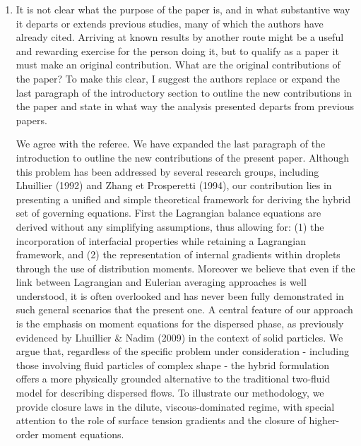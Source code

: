 \documentclass[10pt,a4paper]{article}
\newcommand{\tb}[1]{\color{blue}#1\color{black}}
\begin{document}
\begin{enumerate}
    \item It is not clear what the purpose of the paper is, and in what substantive way it departs or
    extends previous studies, many of which the authors have already cited. Arriving at known
    results by another route might be a useful and rewarding exercise for the person doing it, but
    to qualify as a paper it must make an original contribution. What are the original
    contributions of the paper? To make this clear, I suggest the authors replace or expand the
    last paragraph of the introductory section to outline the new contributions in the paper and
    state in what way the analysis presented departs from previous papers.
    
    \tb{
        We agree with the referee. 
        We have expanded the last paragraph of the introduction to outline the new contributions of the present paper.
        Although this problem has been addressed by several research groups, including Lhuillier (1992) and Zhang et Prosperetti (1994), our contribution lies in presenting a unified and simple theoretical framework for deriving the hybrid set of governing equations.
        First the Lagrangian balance equations are derived without any simplifying assumptions, thus allowing for: (1) the incorporation of interfacial properties while retaining a Lagrangian framework, and (2) the representation of internal gradients within droplets through the use of distribution moments.
        Moreover we believe that even if the link between Lagrangian and Eulerian averaging approaches is well understood, it is often overlooked and has never been fully demonstrated in such general scenarios that the present one.
        A central feature of our approach is the emphasis on moment equations for the dispersed phase, as previously evidenced by Lhuillier \& Nadim (2009) in the context of solid particles. 
        We argue that, regardless of the specific problem under consideration - including those involving fluid particles of complex shape - the hybrid formulation offers a more physically grounded alternative to the traditional two-fluid model for describing dispersed flows.
        To illustrate our methodology, we provide closure laws in the dilute, viscous-dominated regime, with special attention to the role of surface tension gradients and the closure of higher-order moment equations.

}
\end{enumerate}
\end{document}
